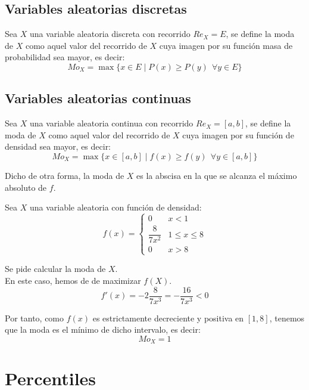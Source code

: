 \subsection{Variables aleatorias discretas}
\begin{definicion}
    Sea $X$ una variable aleatoria discreta con recorrido $Re_X=E$, se define la moda de $X$ como aquel valor del recorrido de $X$ cuya imagen por su función masa de probabilidad sea mayor, es decir:
    $$Mo_X = \max \{x \in E \mid P(x) \geq P(y)~~\forall y \in E\}$$
\end{definicion}

\subsection{Variables aleatorias continuas}
\begin{definicion}
    Sea $X$ una variable aleatoria continua con recorrido $Re_X=[a,b]$, se define la moda de $X$ como aquel valor del recorrido de $X$ cuya imagen por su función de densidad sea mayor, es decir:
    $$Mo_X = \max \{x \in [a,b] \mid f(x) \geq f(y)~~\forall y \in [a,b]\}$$
    
    Dicho de otra forma, la moda de $X$ es la abscisa en la que se alcanza el máximo absoluto de $f$.
\end{definicion}

\begin{ejemplo}
    Sea $X$ una variable aleatoria con función de densidad:
    $$f(x) = \left\{ \begin{array}{ll}
        0               & x < 1           \\
        \dfrac{8}{7x^2} & 1 \leq x \leq 8 \\
        0               & x > 8
      \end{array} \right.$$
    
    Se pide calcular la moda de $X$.\\
    
    En este caso, hemos de de maximizar $f(X)$.
    \begin{equation*}
        f'(x)= -2\frac{8}{7x^3} = -\frac{16}{7x^3}< 0
    \end{equation*}

    Por tanto, como $f(x)$ es estrictamente decreciente y positiva en $[1,8]$, tenemos que la moda es el mínimo de dicho intervalo, es decir:
    $$Mo_X=1$$
\end{ejemplo}

\section{Percentiles}
